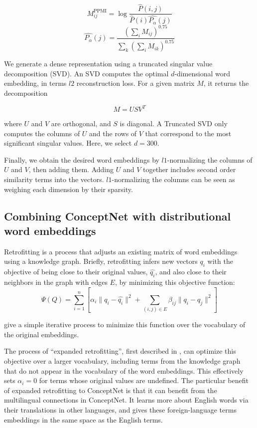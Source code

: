 \documentclass[letterpaper]{article}
\begin{document}
$$
M^\text{PPMI}_{ij} =
\log \frac
  {\hat{P} \left(i, j\right)}
  {\hat{P} \left(i\right) \hat{P_\alpha} \left(j\right)}
$$
$$
\hat{P_\alpha} \left(j\right) =
\frac
  {\left(\sum_i{M_{ij}}\right)^{0.75}}
  {\sum_k{\left(\sum_i{M_{ik}}\right)^{0.75}}}
$$

We generate a dense representation using a truncated singular value
decomposition (SVD). An SVD computes the optimal $d$-dimensional word embedding,
in terms $l2$ reconstruction loss. For a given matrix $M$, it returns the
decomposition

$$
M = USV^T
$$

where $U$ and $V$ are orthogonal, and $S$ is diagonal. A Truncated SVD only
computes the columns of $U$ and the rows of $V$ that correspond to the most
significant singular values. Here, we select $d=300$.

Finally, we obtain the desired word embeddings by $l1$-normalizing the columns
of $U$ and $V$, then adding them. Adding $U$ and $V$ together includes second
order similarity terms into the vectors. $l1$-normalizing the columns can be
seen as weighing each dimension by their sparsity.

\subsection{Combining ConceptNet with distributional word embeddings}

Retrofitting \cite{faruqui2015retrofitting} is a process that adjusts an
existing matrix of word embeddings using a knowledge graph. Briefly, retrofitting
infers new vectors $q_i$ with the objective of being close to their original
values, $\hat{q_i}$, and also close to their neighbors in the graph with edges $E$,
by minimizing this objective function:
$$\Psi(Q) = \sum_{i=1}^{n}\left[
    \alpha_i \lVert q_i - \hat{q_i} \rVert ^2 + \sum_{(i, j) \in E} \beta_{ij} \lVert q_i - q_j \rVert ^2
\right] $$

\citeauthor{faruqui2015retrofitting} give a simple iterative process to minimize
this function over the vocabulary of the original embeddings.

The process of ``expanded retrofitting'', first described in
\cite{speer2016ensemble}, can optimize this objective over a larger vocabulary,
including terms from the knowledge graph that do not appear in the vocabulary
of the word embeddings. This effectively sets $\alpha_i = 0$ for terms whose
original values are undefined. The particular benefit of expanded retrofitting
to ConceptNet is that it can benefit from the multilingual connections in
ConceptNet. It learns more about English words via their translations in other
languages, and gives these foreign-language terms embeddings in the same space
as the English terms.
\end{document}
